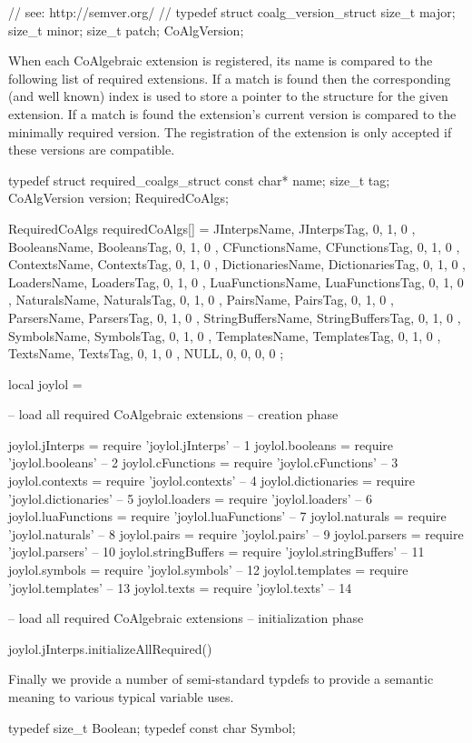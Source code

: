 \startCHeader
// see: http://semver.org/
//
typedef struct coalg_version_struct {
  size_t major;
  size_t minor;
  size_t patch;
} CoAlgVersion;
\stopCHeader

When each CoAlgebraic extension is registered, its name is compared to the 
following list of required extensions. If a match is found then the 
corresponding (and well known) index is used to store a pointer to the 
 structure for the given extension. If a match is found 
the extension's current version is compared to the minimally required 
version. The registration of the extension is only accepted if these 
versions are compatible. 

\startCCode
typedef struct required_coalgs_struct {
  const char*  name;
  size_t       tag;
  CoAlgVersion version;
} RequiredCoAlgs;

RequiredCoAlgs requiredCoAlgs[] = {
  { JInterpsName,      JInterpsTag,      {0, 1, 0 }},
  { BooleansName,      BooleansTag,      {0, 1, 0 }},
  { CFunctionsName,    CFunctionsTag,    {0, 1, 0 }},
  { ContextsName,      ContextsTag,      {0, 1, 0 }},
  { DictionariesName,  DictionariesTag,  {0, 1, 0 }},
  { LoadersName,       LoadersTag,       {0, 1, 0 }},
  { LuaFunctionsName,  LuaFunctionsTag,  {0, 1, 0 }},
  { NaturalsName,      NaturalsTag,      {0, 1, 0 }},
  { PairsName,         PairsTag,         {0, 1, 0 }},
  { ParsersName,       ParsersTag,       {0, 1, 0 }},
  { StringBuffersName, StringBuffersTag, {0, 1, 0 }},
  { SymbolsName,       SymbolsTag,       {0, 1, 0 }},
  { TemplatesName,     TemplatesTag,     {0, 1, 0 }},
  { TextsName,         TextsTag,         {0, 1, 0 }},
  { NULL,              0,                {0, 0, 0 }}
};
\stopCCode

\startLuaCode
local joylol = { }

-- load all required CoAlgebraic extensions -- creation phase

joylol.jInterps      = require 'joylol.jInterps'       --  1
joylol.booleans      = require 'joylol.booleans'       --  2
joylol.cFunctions    = require 'joylol.cFunctions'     --  3
joylol.contexts      = require 'joylol.contexts'       --  4
joylol.dictionaries  = require 'joylol.dictionaries'   --  5
joylol.loaders       = require 'joylol.loaders'        --  6
joylol.luaFunctions  = require 'joylol.luaFunctions'   --  7
joylol.naturals      = require 'joylol.naturals'       --  8
joylol.pairs         = require 'joylol.pairs'          --  9
joylol.parsers       = require 'joylol.parsers'        -- 10
joylol.stringBuffers = require 'joylol.stringBuffers'  -- 11
joylol.symbols       = require 'joylol.symbols'        -- 12
joylol.templates     = require 'joylol.templates'      -- 13
joylol.texts         = require 'joylol.texts'          -- 14

-- load all required CoAlgebraic extensions -- initialization phase

joylol.jInterps.initializeAllRequired()

\stopLuaCode

Finally we provide a number of semi-standard typdefs to provide a semantic 
meaning to various typical variable uses. 

\startCHeader
typedef size_t     Boolean;
typedef const char Symbol;
\stopCHeader
